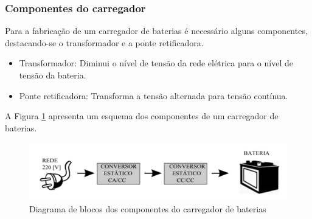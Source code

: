 \subsubsection{Componentes do carregador}
 \par Para a fabricação de um carregador de baterias é necessário alguns componentes, destacando-se o transformador e a ponte retificadora.
\begin{itemize}
\item Transformador: Diminui o nível de tensão da rede elétrica para o nível de tensão da bateria.
\item Ponte retificadora: Transforma a tensão alternada para tensão contínua. 

\end{itemize}
\par A Figura \ref{fig:diagrama_carregador} apresenta um esquema dos componentes de um carregador de baterias.  
\begin{figure}[ht]
		\centering
		\includegraphics[width=1\textwidth]{figuras/imagem.png}
		\caption{Diagrama de blocos dos componentes do carregador de baterias}
		\label{fig:diagrama_carregador}
\end{figure} 






							
